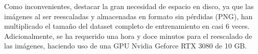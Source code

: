 Como inconvenientes, destacar la gran necesidad de espacio en disco, ya que las imágenes al ser reescaladas y almacenadas en formato sin pérdidas (PNG), han multiplicado el tamaño del dataset completo de entrenamiento en casi 6 veces. Adicionalmente, se ha requerido una hora y doce minutos para el reescalado de las imágenes, haciendo uso de una GPU Nvidia Geforce RTX 3080 de 10 GB. 


